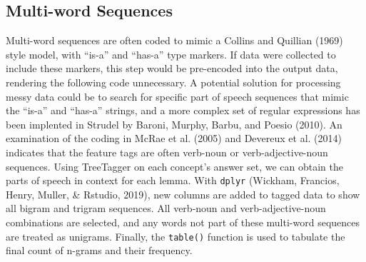 \documentclass[man]{apa6}
\begin{document}
\hypertarget{multi-word-sequences}{%
\subsection{Multi-word Sequences}\label{multi-word-sequences}}

Multi-word sequences are often coded to mimic a Collins and Quillian (1969) style model, with \enquote{is-a} and \enquote{has-a} type markers. If data were collected to include these markers, this step would be pre-encoded into the output data, rendering the following code unnecessary. A potential solution for processing messy data could be to search for specific part of speech sequences that mimic the \enquote{is-a} and \enquote{has-a} strings, and a more complex set of regular expressions has been implented in Strudel by Baroni, Murphy, Barbu, and Poesio (2010). An examination of the coding in McRae et al. (2005) and Devereux et al. (2014) indicates that the feature tags are often verb-noun or verb-adjective-noun sequences. Using TreeTagger on each concept's answer set, we can obtain the parts of speech in context for each lemma. With \texttt{dplyr} (Wickham, Francios, Henry, Muller, \& Rstudio, 2019), new columns are added to tagged data to show all bigram and trigram sequences. All verb-noun and verb-adjective-noun combinations are selected, and any words not part of these multi-word sequences are treated as unigrams. Finally, the \texttt{table()} function is used to tabulate the final count of n-grams and their frequency.

\scriptsize
\end{document}
